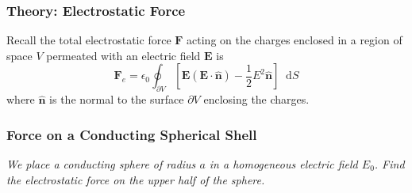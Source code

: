 \documentclass[11pt, a4paper]{article}
\newcommand{\diff}{\mathop{}\!\mathrm{d}} %
\renewcommand{\vec}[1]{\bm{#1}} %
\newcommand{\uvec}[1]{\hat{\vec{#1}}} %
\newcommand{\E}{\vec{E}}  %
\newcommand{\ee}{\epsilon_{0}}  %
\begin{document}
\subsubsection{Theory: Electrostatic Force}
Recall the total electrostatic force $ \vec{F} $ acting on the charges enclosed in a region of space $ V $ permeated with an electric field $ \E $ is
\begin{equation*}
	\vec{F}_{e} = \ee \oint_{\partial V}\left[\E(\E\cdot \uvec{n}) - \frac{1}{2}E^{2} \uvec{n}\right] \diff S
\end{equation*}
where $ \uvec{n} $ is the normal to the surface $ \partial V $ enclosing the charges.


\subsubsection{Force on a Conducting Spherical Shell}
\textit{We place a conducting sphere of radius $ a $ in a homogeneous electric field $ E_{0} $. Find the electrostatic force on the upper half of the sphere.}
\end{document}
